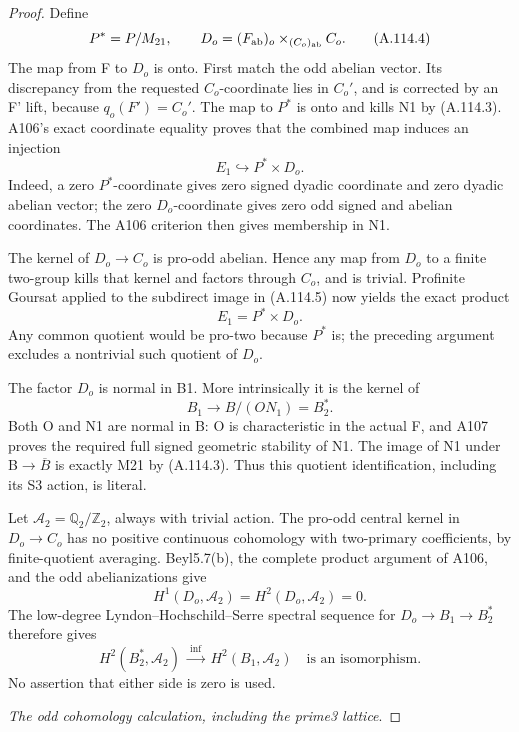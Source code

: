 \begin{proof}
Define
\[
P^*=P/M_{21},\qquad
D_o=(F_{\rm ab})_o\times_{(C_o)_{\rm ab}}C_o.                   \tag{A.114.4}
\]
The map from F to \(D_o\) is onto. First match the odd abelian vector. Its discrepancy from the requested \(C_o\)-coordinate lies in \(C_o'\), and is corrected by an F' lift, because \(q_o(F')=C_o'\). The map to \(P^*\) is onto and kills N1 by (A.114.3). A106's exact coordinate equality proves that the combined map induces an injection
\[
E_1\hookrightarrow P^*\times D_o.                             \tag{A.114.5}
\]
Indeed, a zero \(P^*\)-coordinate gives zero signed dyadic coordinate and zero dyadic abelian vector; the zero \(D_o\)-coordinate gives zero odd signed and abelian coordinates. The A106 criterion then gives membership in N1.

The kernel of \(D_o\to C_o\) is pro-odd abelian. Hence any map from \(D_o\) to a finite two-group kills that kernel and factors through \(C_o\), and is trivial. Profinite Goursat applied to the subdirect image in (A.114.5) now yields the exact product
\[
E_1=P^*\times D_o.                                            \tag{A.114.6}
\]
Any common quotient would be pro-two because \(P^*\) is; the preceding argument excludes a nontrivial such quotient of \(D_o\).

The factor \(D_o\) is normal in B1. More intrinsically it is the kernel of
\[
B_1\longrightarrow B/(ON_1)=B_2^*.
\]
Both O and N1 are normal in B: O is characteristic in the actual F, and A107 proves the required full signed geometric stability of N1. The image of N1 under B\(\to\)\(\overline B\) is exactly M21 by (A.114.3). Thus this quotient identification, including its S3 action, is literal.

Let \(\mathcal A_2=\mathbb Q_2/\mathbb Z_2\), always with trivial action. The pro-odd central kernel in \(D_o\to C_o\) has no positive continuous cohomology with two-primary coefficients, by finite-quotient averaging. Beyl5.7(b), the complete product argument of A106, and the odd abelianizations give
\[
H^1(D_o,\mathcal A_2)=H^2(D_o,\mathcal A_2)=0.                 \tag{A.114.7}
\]
The low-degree Lyndon--Hochschild--Serre spectral sequence for \(D_o\to B_1\to B_2^*\) therefore gives
\[
H^2(B_2^*,\mathcal A_2)\ \xrightarrow{\ \mathrm{inf}\ }\ 
H^2(B_1,\mathcal A_2)
\quad\text{is an isomorphism}.                               \tag{A.114.8}
\]
No assertion that either side is zero is used.

\medskip\noindent\emph{The odd cohomology calculation, including the prime3 lattice}.


\end{proof}
